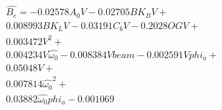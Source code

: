 \begin{equation} \label{eq:polynom_complex}
\begin{aligned} 
 \hat{B_{e}} = - 0.02578 A_{0} V - 0.02705 BK_{B} V + \\ 
 0.008993 BK_{L} V - 0.03191 C_{b} V - 0.2028 OG V + \\ 
 0.003472 V^{2} + \\ 
 0.004234 V \hat{\omega_{0}} - 0.008384 V beam - 0.002591 V phi_{a} + \\ 
 0.05048 V + \\ 
 0.007814 \hat{\omega_{0}}^{2} + \\ 
 0.03882 \hat{\omega_{0}} phi_{a} - 0.001069 \\ 
 \end{aligned}
\end{equation}
